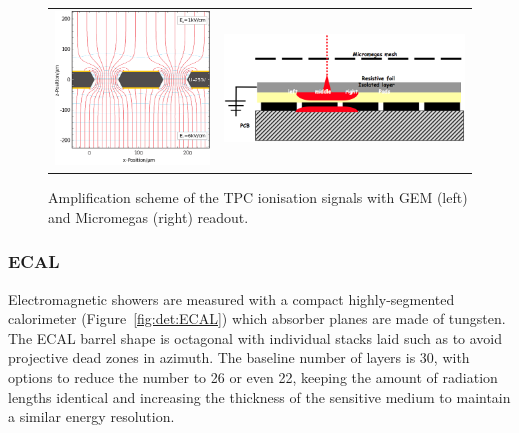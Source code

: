 \begin{figure}[t!]
\begin{tabular}{cc}
\includegraphics[width=0.5\hsize,viewport={0 -10 600 500},clip]{Detector/fig/GEM.png} &
\includegraphics[width=0.4\hsize]{Detector/fig/micromegas.png}
\end{tabular}
\caption[TPC readout]{Amplification scheme of the TPC ionisation signals with GEM (left) and Micromegas (right) readout.}
\label{fig:det:TPC_readout}
\end{figure}

\vspace{1cm}
\subsubsection*{\bf ECAL}

Electromagnetic showers are measured with a compact highly-segmented calorimeter (Figure~\ref{fig:det:ECAL}) which absorber planes are made of tungsten. The ECAL barrel shape is octagonal with individual stacks laid such as to avoid projective dead zones in azimuth. The baseline number of layers is 30, with options to reduce the number to 26 or even 22, keeping the amount of radiation lengths identical and increasing the thickness of the sensitive medium to maintain a similar energy resolution. 

